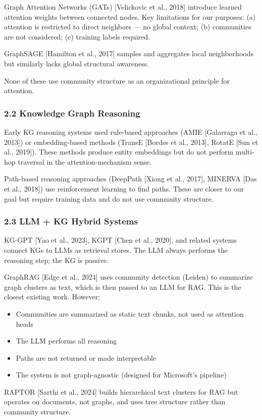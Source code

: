 \documentclass[10pt,journal,compsoc]{IEEEtran}
\begin{document}
Graph Attention Networks (GATs) [Velickovic et al., 2018] introduce learned
attention weights between connected nodes. Key limitations for our purposes:
(a) attention is restricted to direct neighbors — no global context;
(b) communities are not considered; (c) training labels required.

GraphSAGE [Hamilton et al., 2017] samples and aggregates local neigh\-borhoods
but similarly lacks global structural awareness.

None of these use community structure as an organ\-izational principle for
attention.

\subsubsection{2.2 Knowledge Graph Reasoning}

Early KG reasoning systems used rule-based approaches (AMIE [Galarraga et al.,
2013]) or embedding-based methods (TransE [Bordes et al., 2013], RotatE [Sun
et al., 2019]). These methods produce entity embeddings but do not perform
multi-hop traversal in the attention-mechanism sense.

Path-based reasoning approaches (DeepPath [Xiong et al., 2017], MINERVA [Das
et al., 2018]) use reinf\-orcement learning to find paths. These are closer to
our goal but require training data and do not use community structure.

\subsubsection{2.3 LLM + KG Hybrid Systems}

KG-GPT [Yao et al., 2023], KGPT [Chen et al., 2020], and related systems
connect KGs to LLMs as retrieval stores. The LLM always performs the
reasoning step; the KG is passive.

GraphRAG [Edge et al., 2024] uses community detection (Leiden) to summarize
graph clusters as text, which is then passed to an LLM for RAG. This is the
closest existing work. However:
\begin{itemize}
\item Communities are summarized as static text chunks, not used as attention heads
\item The LLM performs all reasoning
\item Paths are not returned or made inter\-pretable
\item The system is not graph-agnostic (designed for Microsoft's pipeline)

\end{itemize}
RAPTOR [Sarthi et al., 2024] builds hiera\-rchical text clusters for RAG but
operates on documents, not graphs, and uses tree structure rather than
community structure.
\end{document}
